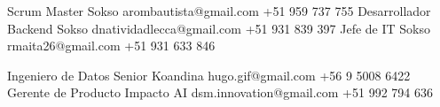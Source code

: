 %
%
%

\vspace{1em}
\begin{referees}
		 	{}
		 	{Scrum Master}
		 	{Sokso}
		 	{arombautista@gmail.com}
		 	{+51 959 737 755}
		 	{}
		 	{Desarrollador Backend}
		 	{Sokso}
		 	{dnatividadlecca@gmail.com}
		 	{+51 931 839 397}
		 	{}
		 	{Jefe de IT}
		 	{Sokso}
		 	{rmaita26@gmail.com}
		 	{+51 931 633 846}
\par\bigskip
		 	{}
		 	{Ingeniero de Datos Senior}
		 	{Koandina}
		 	{hugo.gif@gmail.com}
		 	{+56 9 5008 6422}
		 	{}
		 	{Gerente de Producto}
		 	{Impacto AI}
		 	{dsm.innovation@gmail.com}
		 	{+51 992 794 636}
\end{referees}